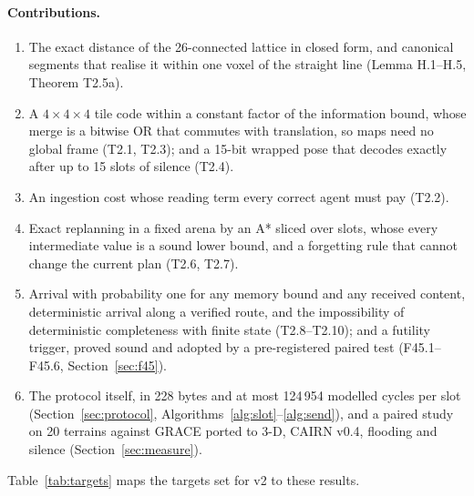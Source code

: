 \documentclass[11pt,a4paper]{article}
\begin{document}
\paragraph{Contributions.}
\begin{enumerate}
\item The exact distance of the 26-connected lattice in closed form, and canonical segments that realise it within one
voxel of the straight line (Lemma H.1--H.5, Theorem T2.5a).
\item A $4\times4\times4$ tile code within a constant factor of the information bound, whose merge is a bitwise OR that
commutes with translation, so maps need no global frame (T2.1, T2.3); and a 15-bit wrapped pose that decodes exactly
after up to 15 slots of silence (T2.4).
\item An ingestion cost whose reading term every correct agent must pay (T2.2).
\item Exact replanning in a fixed arena by an A* sliced over slots, whose every intermediate value is a sound lower
bound, and a forgetting rule that cannot change the current plan (T2.6, T2.7).
\item Arrival with probability one for any memory bound and any received content, deterministic arrival along a
verified route, and the impossibility of deterministic completeness with finite state (T2.8--T2.10); and a futility
trigger, proved sound and adopted by a pre-registered paired test (F45.1--F45.6, Section~\ref{sec:f45}).
\item The protocol itself, in 228 bytes and at most 124\,954 modelled cycles per slot (Section~\ref{sec:protocol},
Algorithms~\ref{alg:slot}--\ref{alg:send}), and a paired study on 20 terrains against GRACE ported to 3-D, CAIRN
v0.4, flooding and silence (Section~\ref{sec:measure}).
\end{enumerate}
Table~\ref{tab:targets} maps the targets set for v2 to these results.
\end{document}
